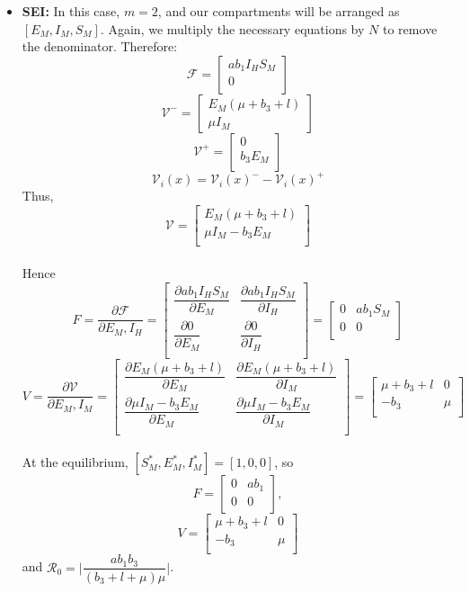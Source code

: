 \begin{itemize}
\item \textbf{SEI:}
In this case, $m=2$, and our compartments will be arranged as $[E_M, I_M, S_M]$. Again, we multiply the necessary equations by $N$ to remove the denominator. Therefore:
$$ {\mathcal F} =\begin{bmatrix}
a b_1 I_H S_M\\
0\\
\end{bmatrix} $$
$$
{\mathcal V^-} = \begin{bmatrix}
E_M (\mu + b_3 + l)\\
\mu I_M
\end{bmatrix}
$$
$$
{\mathcal V^+} = \begin{bmatrix}
0\\
b_3 E_M\\
\end{bmatrix}
$$
$${\mathcal V}_i (x) = {\mathcal V}_i(x)^{-} - {\mathcal V}_i(x)^+$$
Thus,
$$
{\mathcal V} =
\begin{bmatrix}
E_M (\mu + b_3 + l)\\
\mu I_M - b_3 E_M\\
\end{bmatrix}
$$
\\
Hence
$$ F = \dfrac{\partial{\mathcal F}}{\partial E_M, I_H} =\begin{bmatrix}
\dfrac{\partial ab_1 I_H S_M}{\partial E_M} & \dfrac{\partial ab_1 I_H S_M}{\partial I_H}\\
\dfrac{\partial 0}{\partial E_M} & \dfrac{\partial 0}{\partial I_H}\\
\end{bmatrix} = 
\begin{bmatrix}
0 & ab_1 S_M\\
0 & 0\\
\end{bmatrix}$$
$$ V = \dfrac{\partial{\mathcal V}}{\partial E_M, I_M} =\begin{bmatrix}
\dfrac{\partial E_M (\mu + b_3 + l)}{\partial E_M} & \dfrac{\partial E_M (\mu + b_3 + l)}{\partial I_M}\\
\dfrac{\partial \mu I_M - b_3 E_M}{\partial E_M} & \dfrac{\partial \mu I_M - b_3 E_M}{\partial I_M}\\
\end{bmatrix} = 
\begin{bmatrix}
\mu+b_3+l & 0\\
- b_3 & \mu\\
\end{bmatrix}$$
\\At the equilibrium, $[S_M^*, E_M^*, I_M^*] = [1,0,0]$, so $$F=\begin{bmatrix}
0 & ab_1\\
0 & 0\\
\end{bmatrix},$$
$$V = \begin{bmatrix}
\mu+b_3+l & 0\\
- b_3 & \mu\\
\end{bmatrix}$$ and $\mathcal{R}_0 = \Big | \dfrac{ab_1b_3}{(b_3+l+\mu)\mu}\Big | $.


\end{itemize}

